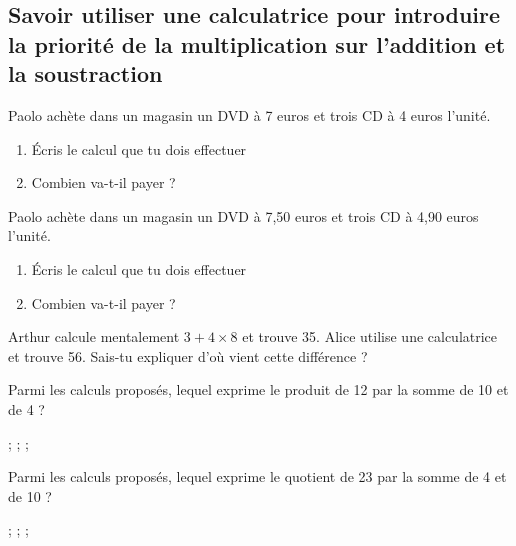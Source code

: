 \subsection{Savoir utiliser une calculatrice pour introduire la priorité de la multiplication sur l'addition et la soustraction}



Paolo achète dans un magasin un DVD à 7 euros et trois CD à 4 euros l'unité. 
\begin{enumerate}
\item Écris le calcul que tu dois effectuer 

\item Combien va-t-il payer ?

\end{enumerate}




Paolo achète dans un magasin un DVD à 7,50 euros et trois CD à 4,90 euros l'unité. 
\begin{enumerate}
\item Écris le calcul que tu dois effectuer 

\item Combien va-t-il payer ?

\end{enumerate}



Arthur calcule mentalement $3 + 4 \times 8$ et trouve 35. Alice utilise une calculatrice et trouve 56. 
Sais-tu expliquer d'où vient cette différence ?





Parmi les calculs proposés, lequel exprime le produit de 12 par la somme de 10 et de 4 ?
 
 ;  ;  ;   







Parmi les calculs proposés, lequel exprime le quotient de 23 par la somme de 4 et de 10 ?
 
 ;  ;  ;   



